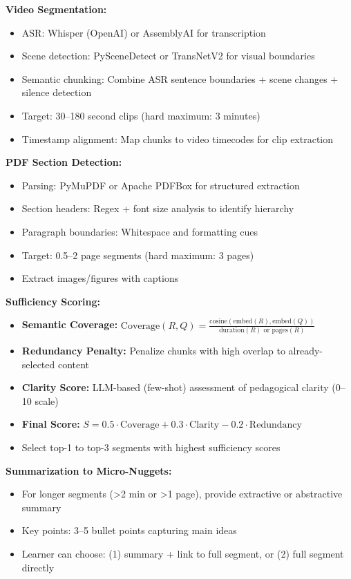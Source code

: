 \documentclass[11pt,letterpaper]{article}
\begin{document}
\textbf{Video Segmentation:}
\begin{itemize}
\item ASR: Whisper (OpenAI) or AssemblyAI for transcription
\item Scene detection: PySceneDetect or TransNetV2 for visual boundaries
\item Semantic chunking: Combine ASR sentence boundaries + scene changes + silence detection
\item Target: 30--180 second clips (hard maximum: 3 minutes)
\item Timestamp alignment: Map chunks to video timecodes for clip extraction
\end{itemize}

\textbf{PDF Section Detection:}
\begin{itemize}
\item Parsing: PyMuPDF or Apache PDFBox for structured extraction
\item Section headers: Regex + font size analysis to identify hierarchy
\item Paragraph boundaries: Whitespace and formatting cues
\item Target: 0.5--2 page segments (hard maximum: 3 pages)
\item Extract images/figures with captions
\end{itemize}

\textbf{Sufficiency Scoring:}
\begin{itemize}
\item \textbf{Semantic Coverage:} $\text{Coverage}(R, Q) = \frac{\text{cosine}(\text{embed}(R), \text{embed}(Q))}{\text{duration}(R) \text{ or } \text{pages}(R)}$
\item \textbf{Redundancy Penalty:} Penalize chunks with high overlap to already-selected content
\item \textbf{Clarity Score:} LLM-based (few-shot) assessment of pedagogical clarity (0--10 scale)
\item \textbf{Final Score:} $S = 0.5 \cdot \text{Coverage} + 0.3 \cdot \text{Clarity} - 0.2 \cdot \text{Redundancy}$
\item Select top-1 to top-3 segments with highest sufficiency scores
\end{itemize}

\textbf{Summarization to Micro-Nuggets:}
\begin{itemize}
\item For longer segments (>2 min or >1 page), provide extractive or abstractive summary
\item Key points: 3--5 bullet points capturing main ideas
\item Learner can choose: (1) summary + link to full segment, or (2) full segment directly
\end{itemize}
\end{document}
